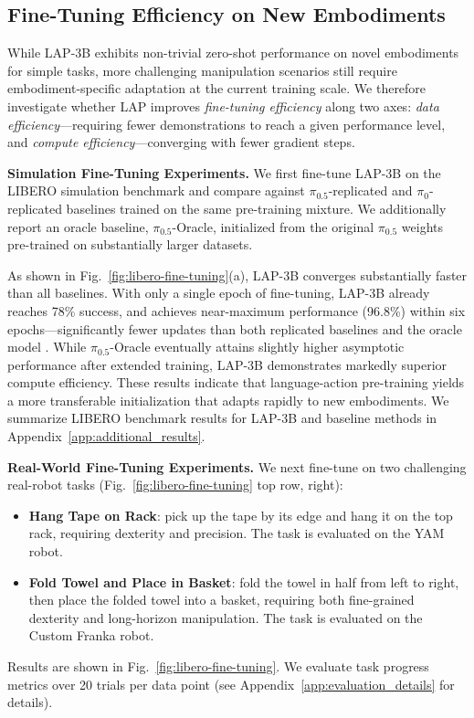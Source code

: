 \subsection{Fine-Tuning Efficiency on New Embodiments}
\label{sec:finetuing}

While \textsc{LAP-3B} exhibits non-trivial zero-shot performance on novel embodiments for simple tasks, more challenging manipulation scenarios still require embodiment-specific adaptation at the current training scale. We therefore investigate whether LAP improves \emph{fine-tuning efficiency} along two axes: \emph{data efficiency}---requiring fewer demonstrations to reach a given performance level, and \emph{compute efficiency}---converging with fewer gradient steps.

\noindent\textbf{Simulation Fine-Tuning Experiments.}
We first fine-tune \textsc{LAP-3B} on the LIBERO simulation benchmark \cite{liu2023liberobenchmarkingknowledgetransfer} and compare against $\pi_{0.5}$-replicated and $\pi_0$-replicated baselines trained on the same pre-training mixture. We additionally report an oracle baseline, $\pi_{0.5}$-Oracle, initialized from the original $\pi_{0.5}$ weights pre-trained on substantially larger datasets.


As shown in Fig.~\ref{fig:libero-fine-tuning}(a), \textsc{LAP-3B} converges substantially faster than all baselines. With only a single epoch of fine-tuning, \textsc{LAP-3B} already reaches 78\% success, and achieves near-maximum performance (96.8\%) within six epochs---significantly fewer updates than both replicated baselines and the oracle model \cite{intelligence2025pi05visionlanguageactionmodelopenworld}. While $\pi_{0.5}$-Oracle eventually attains slightly higher asymptotic performance after extended training, \textsc{LAP-3B} demonstrates markedly superior compute efficiency. These results indicate that language-action pre-training yields a more transferable initialization that adapts rapidly to new embodiments. We summarize LIBERO benchmark results for \textsc{LAP-3B} and baseline methods in Appendix~\ref{app:additional_results}.

\noindent\textbf{Real-World Fine-Tuning Experiments.}
We next fine-tune on two challenging real-robot tasks (Fig.~\ref{fig:libero-fine-tuning} top row, right):
\begin{itemize}
    \item \textbf{Hang Tape on Rack}: pick up the tape by its edge and hang it on the top rack, requiring dexterity and precision. The task is evaluated on the YAM robot.
    \item \textbf{Fold Towel and Place in Basket}: fold the towel in half from left to right, then place the folded towel into a basket, requiring both fine-grained dexterity and long-horizon manipulation. The task is evaluated on the Custom Franka robot.
\end{itemize}
Results are shown in Fig.~\ref{fig:libero-fine-tuning}. We evaluate task progress metrics over 20 trials per data point (see Appendix~\ref{app:evaluation_details} for details).

